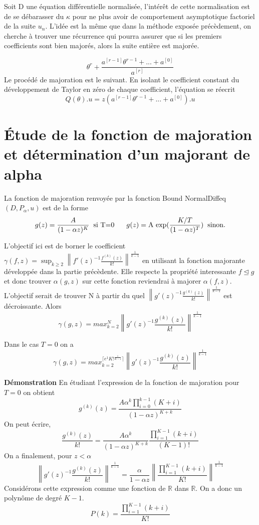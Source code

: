\documentclass[a4paper,10.5pt]{article}
\begin{document}
	Soit D une équation différentielle normalisée, l'intérêt de cette normalisation est de se débarasser du $\kappa$ pour ne plus avoir de comportement asymptotique factoriel de la suite $u_n$. L'idée est la même que dans la méthode exposée précèdement, on cherche à trouver une récurrence qui pourra assurer que si les premiers coefficients sont bien majorés, alors la suite entière est majorée.
	
	\[\theta^{r}+\frac{a^{[r-1]}\theta^{r-1}+...+a^{[0]}}{a^{[r]}}\]
	Le procédé de majoration est le suivant. En isolant le coefficient constant du développement de Taylor en zéro de chaque coefficient, l'équation se réecrit
	\[Q(\theta).u=z(a^{[r-1]}\theta^{r-1}+...+a^{[0]}).u\]
	
	
	\newpage
	
	
	
	\section{Étude de la fonction de majoration et détermination d'un majorant de alpha}
	La fonction de majoration renvoyée par la fonction Bound NormalDiffeq$(D,P_{\alpha},u)$  est de la  forme
	\[g(z)=\frac{A}{(1-\alpha z)^{K}} \hspace{2mm}\text{si T=0}\hspace{6mm} g(z)=\text{A exp}(\frac{K/T}{(1-\alpha z)^{T}}) \hspace{2mm} \text{sinon.} \]
	
	\noindent L'objectif ici est de borner le coefficient $\gamma(f,z)=\sup_{k \geq 2} \left\|f'(z)^{-1}\frac{f^{(k)}(z)}{k!}\right\|^{\frac{1}{k-1}}$ en utilisant la fonction majorante développée dans la partie précèdente. Elle respecte la propriété interessante $f\unlhd g$ et donc trouver $\alpha(g,z)$ sur cette fonction reviendrai à majorer $\alpha(f,z)$. L'objectif serait de trouver N à partir du quel $\left\|g'(z)^{-1}\frac{g^{(k)}(z)}{k!}\right\|^{\frac{1}{k-1}}$ est décroissante. Alors 
	\[\gamma(g,z)=max_{k=2}^{N}\left\|g'(z)^{-1}\frac{g^{(k)}(z)}{k!}\right\|^{\frac{1}{k-1}}\] 
	
	\begin{proposition} Dans le cas $T=0$ on a \[\gamma(g,z)=max_{k=2}^{\lceil e^{1}K!^{\frac{1}{K-1}} \rceil}\left\|g'(z)^{-1}\frac{g^{(k)}(z)}{k!}\right\|^{\frac{1}{k-1}}\]
	\end{proposition}

	\noindent\textbf{Démonstration}
	\noindent En étudiant l'expression de la fonction de majoration pour $T=0$ on obtient
	\[g^{(k)}(z)=\frac{A\alpha^{k}\prod_{i=0}^{k-1}(K+i)}{(1-\alpha z)^{K+k}}\]
	On peut écrire,
	\[\frac{g^{(k)}(z)}{k!}=\frac{A\alpha^{k}}{(1-\alpha z)^{K+k}} \frac{\prod_{i=1}^{K-1}(k+i)}{(K-1)!} \]
	On a finalement, pour $z < \alpha$ 
	\[\left\|g'(z)^{-1}\frac{g^{(k)}(z)}{k!}\right\|^{\frac{1}{k-1}}= \frac{\alpha}{1-\alpha z} \left\|\frac{\prod_{i=1}^{K-1}(k+i)}{K!}\right\|^{\frac{1}{k-1}} \tag{*}\]
	Considérons cette expression comme une fonction de $\mathbb{R}$ dans $\mathbb{R}$. On a donc un polynôme de degré $K-1$.
	\[P(k)=\frac{\prod_{i=1}^{K-1}(k+i)}{K!}\]
	
\end{document}
